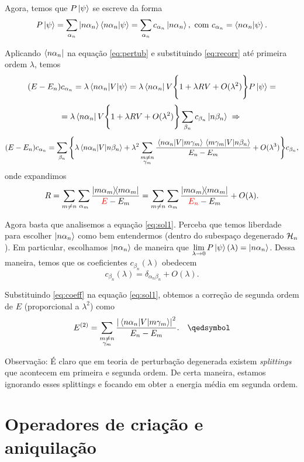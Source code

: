 \documentclass[a4paper,12pt]{article}
\begin{document}
Agora, temos que $P \ket{\psi}$ se escreve da forma
$$
P \ket{\psi} = \sum_{\alpha_n} \ket{n \alpha_n} \braket{n\alpha_n}{\psi} =
\sum_{\alpha_n} c_{\alpha_n} \ket{n \alpha_n}, \text{ com } c_{\alpha_n} = \braket{n\alpha_n}{\psi}.
$$

Aplicando $\bra{n \alpha_n}$ na equação \ref{eq:pertub} e substituindo \ref{eq:recorr} até primeira ordem $\lambda$, temos
$$
(E - E_n) c_{\alpha_n} = \lambda \mel{n \alpha_n}{V}{\psi} =
\lambda \bra{n \alpha_n} V \Bigg\{ 1 + \lambda R V + O(\lambda^2) \Bigg\} P \ket{\psi} =
$$
$$
=
\lambda \bra{n \alpha_n} V \Bigg\{ 1 + \lambda R V + O(\lambda^2) \Bigg\} \sum_{\beta_n} c_{\beta_n} \ket{n \beta_n} \; \Rightarrow \;
$$
\begin{equation} \label{eq:sol1}
(E - E_n) c_{\alpha_n} =
\sum_{\beta_n} \Bigg\{
\lambda \mel{n \alpha_n}{V}{n \beta_n} + \lambda^2 \sum_{\substack{m \neq n \\ \gamma_m}}
\frac{\mel{n \alpha_n}{V}{m \gamma_m} \mel{m \gamma_m}{V}{n \beta_n}}{E_n - E_m} + O(\lambda^3)
\Bigg\} c_{\beta_n},
\end{equation}
onde expandimos
$$
R = \sum_{m \neq n} \sum_{\alpha_m} \frac{\ketbra{m \alpha_m}}{\textcolor{red}{E} - E_m}
= \sum_{m \neq n} \sum_{\alpha_m} \frac{\ketbra{m \alpha_m}}{\textcolor{red}{E_n} - E_m} + O(\lambda).
$$

Agora basta que analisemos a equação \ref{eq:sol1}. Perceba que temos liberdade para escolher $\ket{n \alpha_n}$ como bem entendermos (dentro do subespaço degenerado $\mathcal{H}_n$). Em particular, escolhamos $\ket{n \alpha_n}$ de maneira que $\displaystyle{\lim_{\lambda \to 0} P \ket{\psi} (\lambda) = \ket{n \alpha_n}}$. Dessa maneira, temos que os coeficientes $c_{\beta_n}(\lambda)$ obedecem
\begin{equation} \label{eq:coeff}
c_{\beta_n}(\lambda) = \delta_{\alpha_n \beta_n} + O(\lambda).
\end{equation}

Substituindo \ref{eq:coeff} na equação \ref{eq:sol1}, obtemos a correção de segunda ordem de $E$ (proporcional a $\lambda^2$) como
$$
E^{(2)} = \sum_{\substack{m \neq n \\ \gamma_m}} \frac{\abs{\mel{n \alpha_n}{V}{m \gamma_m}}^2}{E_n - E_m}.
\quad \qedsymbol
$$

Observação: É claro que em teoria de perturbação degenerada existem \textit{splittings} que acontecem em primeira e segunda ordem. De certa maneira, estamos ignorando esses splittings e focando em obter a energia média em segunda ordem.



\pagebreak



\section{Operadores de criação e aniquilação}
\end{document}

